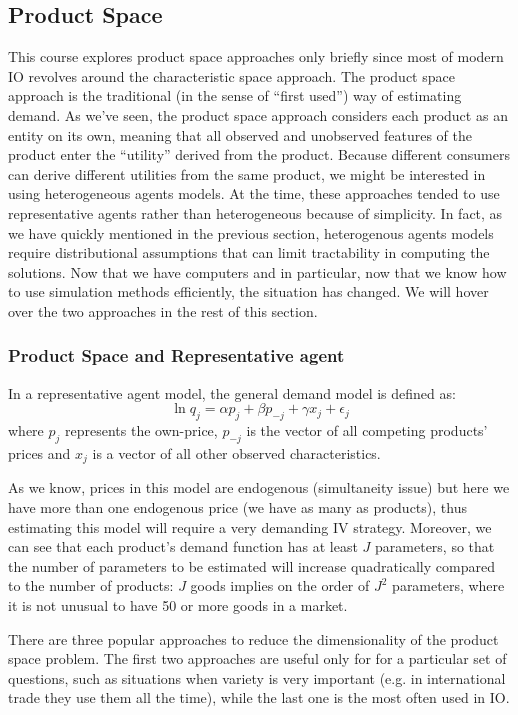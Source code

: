 \subsection{Product Space}

This course explores product space approaches only briefly since most of modern IO revolves around the characteristic space approach. The product space approach is the traditional (in the sense of ``first used'') way of estimating demand. As we've seen, the product space approach considers each product as an entity on its own, meaning that all observed and unobserved features of the product enter the ``utility'' derived from the product. Because different consumers can derive different utilities from the same product, we might be interested in using heterogeneous agents models. At the time, these approaches tended to use representative agents rather than heterogeneous because of simplicity. In fact, as we have quickly mentioned in the previous section, heterogenous agents models require distributional assumptions that can limit tractability in computing the solutions. Now that we have computers and in particular, now that we know how to use simulation methods efficiently, the situation has changed. We will hover over the two approaches in the rest of this section.

\subsubsection{Product Space and Representative agent}

In a representative agent model, the general demand model is defined as: $$\ln q_j = \alpha p_j + \beta p_{-j} + \gamma x_j + \epsilon_j $$ where $p_j$ represents the own-price, $p_{-j}$ is the vector of all competing products' prices and $x_j$ is a vector of all other observed characteristics.

As we know, prices in this model are endogenous (simultaneity issue) but here we have more than one endogenous price (we have as many as products), thus estimating this model will require a very demanding IV strategy. Moreover, we can see that each product's demand function has at least $J$ parameters, so that the number of parameters to be estimated will increase quadratically compared to the number of products: $J$ goods implies on the order of $J^2$ parameters, where it is not unusual to have 50 or more goods in a market.

There are three popular approaches to reduce the dimensionality of the product space problem. The first two approaches are useful only for for a particular set of questions, such as situations when variety is very important (e.g. in international trade they use them all the time), while the last one is the most often used in IO.

